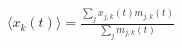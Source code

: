 \documentclass[12pt]{standalone}
\begin{document}
$\displaystyle
\langle x_k(t) \rangle =\frac{\sum_j x_{j,k} (t) m_{j,k} (t)} {\sum_j m_{j,k}(t)}
$
\end{document}
